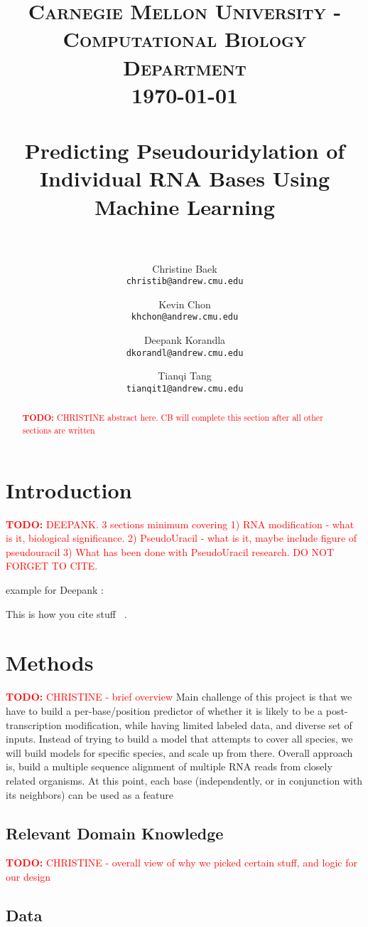 \documentclass[paper=a4, fontsize=11pt]{scrartcl}
\title{
    \usefont{OT1}{bch}{b}{n}
    \normalfont \normalsize \textsc{Carnegie Mellon University - Computational Biology Department} \\ [25pt]
    \today \\
    \horrule{0.5pt} \\[0.4cm]
    \huge Predicting Pseudouridylation of Individual RNA Bases Using Machine Learning\\
    \horrule{2pt} \\[0.5cm]
}
\author{
  Christine Baek\\
  \normalsize\texttt{christib@andrew.cmu.edu}
  \and
  Kevin Chon\\
  \normalsize\texttt{khchon@andrew.cmu.edu}
  \and
  Deepank Korandla\\
  \normalsize\texttt{dkorandl@andrew.cmu.edu}
   \and
  Tianqi Tang\\
  \normalsize\texttt{tianqit1@andrew.cmu.edu}
  \date{}
}
\date{}
\numberwithin{equation}{section}    %
\numberwithin{figure}{section}      %
\numberwithin{table}{section}       %
\newcommand{\TODO}[1]{\textcolor{red}{\textbf{TODO: } #1}}
\numberwithin{equation}{section}    %
\numberwithin{figure}{section}      %
\numberwithin{table}{section}       %
\begin{document}
\maketitle

\begin{abstract}
\TODO{CHRISTINE abstract here. CB will complete this section after all other sections are written}
\end{abstract}


\section{Introduction}

\TODO{DEEPANK. 3 sections minimum covering 1) RNA modification - what is it, biological significance. 2) PseudoUracil - what is it, maybe include figure of pseudouracil 3) What has been done with PseudoUracil research. DO NOT FORGET TO CITE.}

example for Deepank : 

This is how you cite stuff ~\cite{schwartz}.




\section{Methods}


\TODO{CHRISTINE - brief overview}
Main challenge of this project is that we have to build a per-base/position predictor of whether it is likely to be a post-transcription modification, while having limited labeled data, and diverse set of inputs. Instead of trying to build a model that attempts to cover all species, we will build models for specific species, and scale up from there. Overall approach is, build a multiple sequence alignment of multiple RNA reads from closely related organisms. At this point, each base (independently, or in conjunction with its neighbors) can be used as a feature

\subsection{Relevant Domain Knowledge}

\TODO{CHRISTINE - overall view of why we picked certain stuff, and logic for our design}


\subsection{Data}
\end{document}
